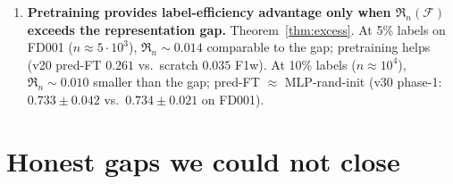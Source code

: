 \documentclass[11pt]{article}
\begin{document}
\begin{enumerate}[leftmargin=1.5em,label=(R\arabic*)]
\item \textbf{Pretraining provides label-efficiency advantage only when
$\mathfrak R_n(\mathcal F)$ exceeds the representation gap.}
Theorem~\ref{thm:excess}. At 5\% labels on FD001 ($n\approx 5\cdot 10^3$),
$\mathfrak R_n\sim 0.014$ comparable to the gap; pretraining helps
(v20 pred-FT $0.261$ vs.\ scratch $0.035$ F1w). At 10\% labels
($n\approx 10^4$), $\mathfrak R_n\sim 0.010$ smaller than the gap; pred-FT
$\approx$ MLP-rand-init (v30 phase-1: $0.733\pm 0.042$ vs.\
$0.734\pm 0.021$ on FD001).
\end{enumerate}

\section{Honest gaps we could not close}
\end{document}
